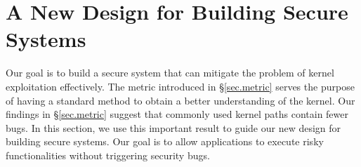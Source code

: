 \section{A New Design for Building Secure Systems}
\label{sec.design}



Our goal is to build a secure system that can mitigate the problem of kernel exploitation effectively. 
The metric introduced in \S{\ref{sec.metric}} serves the purpose of having a standard method to 
obtain a better understanding of the kernel. %
Our findings in \S{\ref{sec.metric}} suggest that commonly used kernel paths contain fewer bugs.
In this section, we use this important result to guide our new design for building secure systems. 
Our goal is to allow applications to execute risky functionalities without triggering security bugs.

